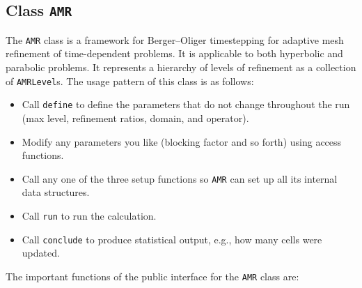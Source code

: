 \subsection{Class {\tt AMR}}

   The {\tt AMR} class is a framework for Berger--Oliger timestepping for
   adaptive mesh refinement of time-dependent problems.  It is
   applicable to both hyperbolic and parabolic problems.  It
   represents a hierarchy of levels of refinement as a collection of
   {\tt AMRLevel}s.  
   The usage pattern of this class is as follows: 
\begin{itemize}
\item Call \verb/define/ to define the parameters that do not change
      throughout the run (max level, refinement ratios, domain, and operator).
\item Modify any parameters you like (blocking factor and so forth)
      using access functions.
\item Call any one of the three setup functions so \verb|AMR| can set up all its
      internal data structures.
\item Call \verb/run/ to run the calculation.
\item Call \verb/conclude/ to produce statistical output, e.g., how many
      cells were updated. 
\end{itemize}
The important functions of the public interface for the \verb|AMR| class are:

